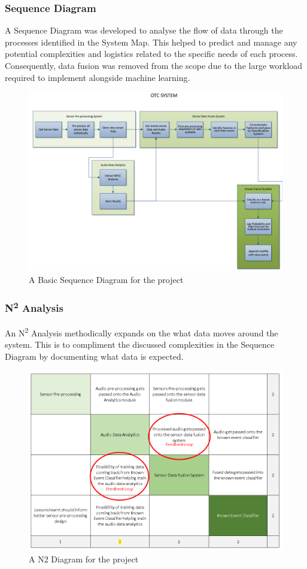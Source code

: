 \documentclass{UoNMCHA}
\numberwithin{equation}{section}
\begin{document}
\subsubsection{Sequence Diagram}
A Sequence Diagram was developed to analyse the flow of data through the processes identified in the System Map. This helped to predict and manage any potential complexities and logistics related to the specific needs of each process. 
Consequently, data fusion was removed from the scope due to the large workload required to implement alongside machine learning. 
\begin{figure}[ht]
    \begin{center}
        \includegraphics[width=0.8\linewidth]{Figures/SequenceDiagram.png}
        \caption{A Basic Sequence Diagram for the project}
        \label{fig:AndroidDataExample}
    \end{center}
 \end{figure}

\subsubsection{N\textsuperscript{2} Analysis}
An N\textsuperscript{2}  Analysis methodically expands on the what data moves around the system. This is to compliment the discussed complexities in the Sequence Diagram by documenting what data is expected.
\begin{figure}[ht]
    \begin{center}
        \includegraphics[width=0.8\linewidth]{Figures/n2analysis.png}
        \caption{A N2 Diagram for the project}
        \label{fig:AndroidDataExample}
    \end{center}
 \end{figure}
\end{document}
